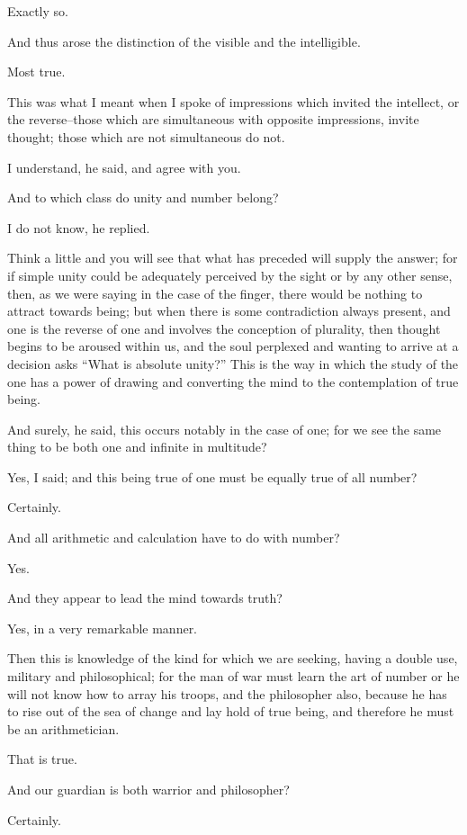 Exactly so.

And thus arose the distinction of the visible and the intelligible.

Most true.

This was what I meant when I spoke of impressions which invited the
intellect, or the reverse--those which are simultaneous with opposite
impressions, invite thought; those which are not simultaneous do not.

I understand, he said, and agree with you.

And to which class do unity and number belong?

I do not know, he replied.

Think a little and you will see that what has preceded will supply the
answer; for if simple unity could be adequately perceived by the sight
or by any other sense, then, as we were saying in the case of the
finger, there would be nothing to attract towards being; but when there
is some contradiction always present, and one is the reverse of one and
involves the conception of plurality, then thought begins to be aroused
within us, and the soul perplexed and wanting to arrive at a decision
asks ``What is absolute unity?'' This is the way in which the study of the
one has a power of drawing and converting the mind to the contemplation
of true being.

And surely, he said, this occurs notably in the case of one; for we see
the same thing to be both one and infinite in multitude?

Yes, I said; and this being true of one must be equally true of all
number?

Certainly.

And all arithmetic and calculation have to do with number?

Yes.

And they appear to lead the mind towards truth?

Yes, in a very remarkable manner.

Then this is knowledge of the kind for which we are seeking, having a
double use, military and philosophical; for the man of war must learn
the art of number or he will not know how to array his troops, and the
philosopher also, because he has to rise out of the sea of change and
lay hold of true being, and therefore he must be an arithmetician.

That is true.

And our guardian is both warrior and philosopher?

Certainly.

